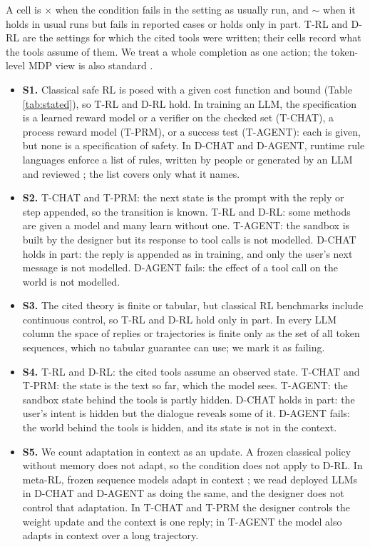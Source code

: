 \documentclass{article}
\providecommand{\tightlist}{\setlength{\itemsep}{0pt}\setlength{\parskip}{0pt}}
\begin{document}
A cell is \(\times\) when the condition fails in the setting as usually run, and \(\sim\) when it holds in usual runs but fails in reported cases or holds only in part. T-RL and D-RL are the settings for which the cited tools were written; their cells record what the tools assume of them. We treat a whole completion as one action; the token-level MDP view is also standard \citep[§6.3.2.2]{lambert2025}.

\begin{itemize}
\tightlist
\item
  \textbf{S1.} Classical safe RL is posed with a given cost function and bound (Table \ref{tab:stated}), so T-RL and D-RL hold. In training an LLM, the specification is a learned reward model or a verifier on the checked set (T-CHAT), a process reward model (T-PRM), or a success test (T-AGENT): each is given, but none is a specification of safety. In D-CHAT and D-AGENT, runtime rule languages enforce a list of rules, written by people or generated by an LLM and reviewed \citep{wang2026}; the list covers only what it names.
\item
  \textbf{S2.} T-CHAT and T-PRM: the next state is the prompt with the reply or step appended, so the transition is known. T-RL and D-RL: some methods are given a model and many learn without one. T-AGENT: the sandbox is built by the designer but its response to tool calls is not modelled. D-CHAT holds in part: the reply is appended as in training, and only the user's next message is not modelled. D-AGENT fails: the effect of a tool call on the world is not modelled.
\item
  \textbf{S3.} The cited theory is finite or tabular, but classical RL benchmarks include continuous control, so T-RL and D-RL hold only in part. In every LLM column the space of replies or trajectories is finite only as the set of all token sequences, which no tabular guarantee can use; we mark it as failing.
\item
  \textbf{S4.} T-RL and D-RL: the cited tools assume an observed state. T-CHAT and T-PRM: the state is the text so far, which the model sees. T-AGENT: the sandbox state behind the tools is partly hidden. D-CHAT holds in part: the user's intent is hidden but the dialogue reveals some of it. D-AGENT fails: the world behind the tools is hidden, and its state is not in the context.
\item
  \textbf{S5.} We count adaptation in context as an update. A frozen classical policy without memory does not adapt, so the condition does not apply to D-RL. In meta-RL, frozen sequence models adapt in context \citep{duan2016, wang2016, laskin2022}; we read deployed LLMs in D-CHAT and D-AGENT as doing the same, and the designer does not control that adaptation. In T-CHAT and T-PRM the designer controls the weight update and the context is one reply; in T-AGENT the model also adapts in context over a long trajectory.

\end{itemize}
\end{document}
